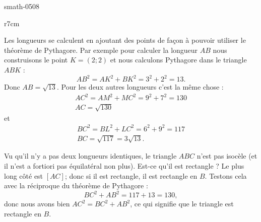 
\begin{corrige}{smath-0508}


\begin{wrapfigure}{r}{7cm}
   \vspace{-0.5cm}        %
   \centering
   
\end{wrapfigure}

    Les longueurs se calculent en ajoutant des points de façon à pouvoir utiliser le théorème de Pythagore. Par exemple pour calculer la longueur \( AB\) nous construisons le point \( K=(2;2)\) et nous calculons Pythagore dans le triangle \( ABK\) :
    \begin{equation}
        AB^2=AK^2+BK^2=3^2+2^2=13.
    \end{equation}
    Donc \( AB=\sqrt{13}\). Pour les deux autres longueurs c'est la même chose :
    \begin{subequations}
        \begin{align}
            AC^2=AM^2+MC^2=9^2+7^2=130\\
            AC=\sqrt{130}
        \end{align}
    \end{subequations}
    et
    \begin{subequations}
        \begin{align}
            BC^2=BL^2+LC^2=6^2+9^2=117\\
            BC=\sqrt{117}=3\sqrt{13}.
        \end{align}
    \end{subequations}

    Vu qu'il n'y a pas deux longueurs identiques, le triangle \( ABC\) n'est pas isocèle (et il n'est a fortiori pas équilatéral non plus). Est-ce qu'il est rectangle ? Le plus long côté est \( [AC]\); donc si il est rectangle, il est rectangle en \( B\). Testons cela avec la réciproque du théorème de Pythagore :
    \begin{equation}
        BC^2+AB^2=117+13=130,
    \end{equation}
    donc nous avons bien \( AC^2=BC^2+AB^2\), ce qui signifie que le triangle est rectangle en \( B\).

\end{corrige}
